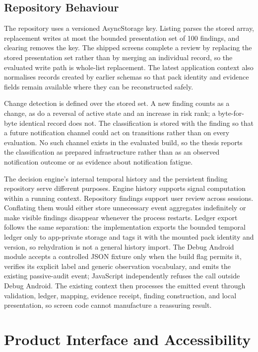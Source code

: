 \subsection{Repository Behaviour}

The repository uses a versioned AsyncStorage key. Listing parses the stored array, replacement writes at most the bounded presentation set of 100 findings, and clearing removes the key. The shipped screens complete a review by replacing the stored presentation set rather than by merging an individual record, so the evaluated write path is whole-list replacement. The latest application context also normalises records created by earlier schemas so that pack identity and evidence fields remain available where they can be reconstructed safely.

Change detection is defined over the stored set. A new finding counts as a change, as do a reversal of active state and an increase in risk rank; a byte-for-byte identical record does not. The classification is stored with the finding so that a future notification channel could act on transitions rather than on every evaluation. No such channel exists in the evaluated build, so the thesis reports the classification as prepared infrastructure rather than as an observed notification outcome or as evidence about notification fatigue.

The decision engine's internal temporal history and the persistent finding repository serve different purposes. Engine history supports signal computation within a running context. Repository findings support user review across sessions. Conflating them would either store unnecessary event aggregates indefinitely or make visible findings disappear whenever the process restarts. Ledger export follows the same separation: the implementation exports the bounded temporal ledger only to app-private storage and tags it with the mounted pack identity and version, so rehydration is not a general history import. The Debug Android module accepts a controlled JSON fixture only when the build flag permits it, verifies its explicit label and generic observation vocabulary, and emits the existing passive-audit event; JavaScript independently refuses the call outside Debug Android. The existing context then processes the emitted event through validation, ledger, mapping, evidence receipt, finding construction, and local presentation, so screen code cannot manufacture a reassuring result.


\section{Product Interface and Accessibility}

